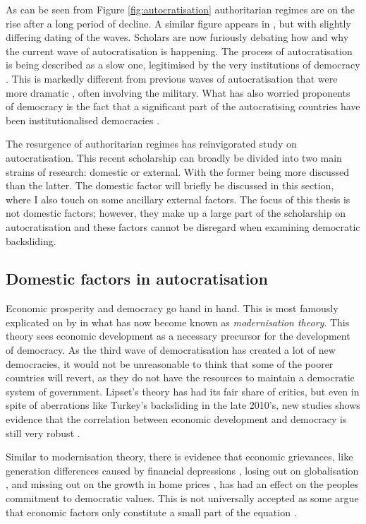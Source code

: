 As can be seen from Figure \ref{fig:autocratisation} authoritarian regimes are on the rise after a long period of decline. A similar figure appears in \citet{luhrmann_third_2019}, but with slightly differing dating of the waves. Scholars are now furiously debating how and why the current wave of autocratisation is happening. The process of autocratisation is being described as a slow one, legitimised by the very institutions of democracy \citep{varol_stealth_2015, bermeo_democratic_2016, luhrmann_third_2019}. This is markedly different from previous waves of autocratisation that were more dramatic \citep[pp. 6-8]{bermeo_democratic_2016}, often involving the military. What has also worried proponents of democracy is the fact that a significant part of the autocratising countries have been institutionalised democracies \citep{luhrmann_third_2019}. 

The resurgence of authoritarian regimes has reinvigorated study on autocratisation. This recent scholarship can broadly be divided into two main strains of research: domestic or external. With the former being more discussed than the latter. The domestic factor will briefly be discussed in this section, where I also touch on some ancillary external factors. The focus of this thesis is not domestic factors; however, they make up a large part of the scholarship on autocratisation and these factors cannot be disregard when examining democratic backsliding.

\subsection{Domestic factors in autocratisation}
Economic prosperity and democracy go hand in hand. This is most famously explicated on by \citet{lipset_social_1959} in what has now become known as \textit{modernisation theory}. This theory sees economic development as a necessary precursor for the development of democracy. As the third wave of democratisation has created a lot of new democracies, it would not be unreasonable to think that some of the poorer countries will revert, as they do not have the resources to maintain a democratic system of government. Lipset's theory has had its fair share of critics, but even in spite of aberrations like Turkey's backsliding in the late 2010's, new studies shows evidence that the correlation between economic development and democracy is still very robust \citep{brownlee_limited_2017}.

Similar to modernisation theory, there is evidence that economic grievances, like generation differences caused by financial depressions \citep[pp. 132-174]{norris_cultural_2019}, losing out on globalisation \citep{ballard-rosa_economic_2021}, and missing out on the growth in home prices \citep{ansell_sheltering_2022}, has had an effect on the peoples commitment to democratic values. This is not universally accepted as some argue that economic factors only constitute a small part of the equation \citep{margalit_economic_2019}.

